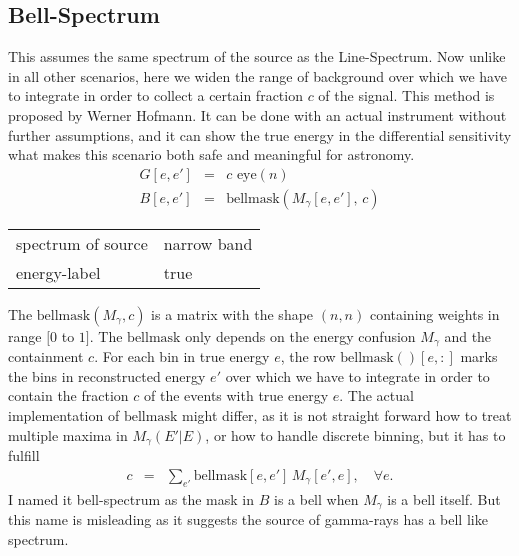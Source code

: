 \documentclass{article}%
\begin{document}
\subsection{Bell-Spectrum}
%
This assumes the same spectrum of the source as the Line-Spectrum.
%
Now unlike in all other scenarios, here we widen the range of background over which we have to integrate in order to collect a certain fraction $c$ of the signal.
%
This method is proposed by Werner Hofmann.
%
It can be done with an actual instrument without further assumptions, and it can show the true energy in the differential sensitivity what makes this scenario both safe and meaningful for astronomy.
%
\begin{eqnarray}
G[e, e'] &=& c \, \, \mathrm{eye}(n)
\\
B[e, e'] &=& \mathrm{bellmask}(M_{\gamma}[e, e'], \, c)
\end{eqnarray}
%
\begin{center}
\begin{tabular}{ll}
spectrum of source & narrow band\\
energy-label & true\\
\end{tabular}
\end{center}
%
The $\mathrm{bellmask}(M_{\gamma}, c)$ is a matrix with the shape $(n,n)$ containing weights in range $[0$ to $1]$.
%
The $\mathrm{bellmask}$ only depends on the energy confusion $M_{\gamma}$ and the containment $c$.
%
For each bin in true energy $e$, the row $\mathrm{bellmask}()[e, :]$ marks the bins in reconstructed energy $e'$ over which we have to integrate in order to contain the fraction $c$ of the events with true energy $e$.
%
The actual implementation of $\mathrm{bellmask}$ might differ, as it is not straight forward how to treat multiple maxima in $M_\gamma(E'\vert E)$, or how to handle discrete binning, but it has to fulfill
%
\begin{eqnarray}
c &=& \sum_{e'} \mathrm{bellmask}[e ,e'] \, M_{\gamma}[e', e], \,\,\,\,\,\, \forall e.
\end{eqnarray}
%
I named it bell-spectrum as the mask in $B$ is a bell when $M_\gamma$ is a bell itself. But this name is misleading as it suggests the source of gamma-rays has a bell like spectrum.
%
%
%
\end{document}

